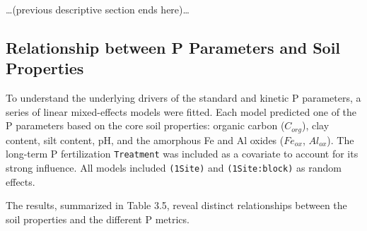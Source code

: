 \documentclass[
  a4paper,
]{article}
\begin{document}
\ldots(previous descriptive section ends here)\ldots{}

\subsection{Relationship between P Parameters and Soil
Properties}\label{relationship-between-p-parameters-and-soil-properties}

To understand the underlying drivers of the standard and kinetic P
parameters, a series of linear mixed-effects models were fitted. Each
model predicted one of the P parameters based on the core soil
properties: organic carbon (\(C_{org}\)), clay content, silt content,
pH, and the amorphous Fe and Al oxides (\(Fe_{ox}\), \(Al_{ox}\)). The
long-term P fertilization \texttt{Treatment} was included as a covariate
to account for its strong influence. All models included
\texttt{(1\textbar{}Site)} and \texttt{(1\textbar{}Site:block)} as
random effects.

The results, summarized in Table 3.5, reveal distinct relationships
between the soil properties and the different P metrics.
\end{document}
